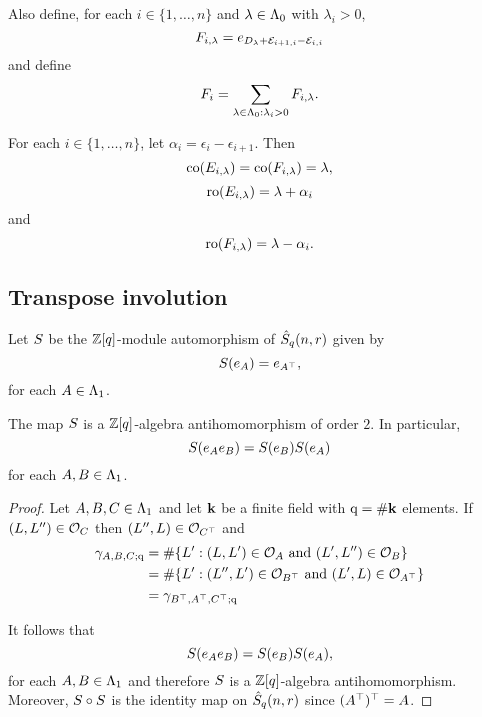 \documentclass[a4paper, 11pt]{report}
\begin{document}
Also define, for each $i\in\{1,\ldots,n\}$ and $\lambda\in\Lambda_0{}$ with $\lambda_i>0$,
\begin{equation*}
F_{i,\lambda} = e_{D_{\lambda} + \mathcal{E}_{i+1,i} - \mathcal{E}_{i,i}}
\end{equation*}
and define
\begin{equation*}
F_i = \sum_{\lambda\in\Lambda_0{}:\lambda_i>0} F_{i,\lambda}.
\end{equation*}

For each $i\in\{1,\ldots,n\}$, let $\alpha_i=\epsilon_i-\epsilon_{i+1}$. Then
\begin{equation*}
\operatorname{co}(E_{i,\lambda}) = \operatorname{co}(F_{i,\lambda})=\lambda,
\end{equation*}
\begin{equation*}
\operatorname{ro}(E_{i,\lambda}) = \lambda +\alpha_i
\end{equation*}
and
\begin{equation*}
\operatorname{ro}(F_{i,\lambda}) = \lambda - \alpha_i.
\end{equation*}

\subsection{Transpose involution}

Let $S{}$ be the $\mathbb{Z}[q]$-module automorphism of $\hat{S}_q(n,r)$ given by
\begin{equation*}
S{(e_A)} = e_{A^\top},
\end{equation*}
for each $A\in\Lambda_1{}$.

\begin{lemma}\label{lemma:transpose-involution}
The map $S{}$ is a $\mathbb{Z}[q]$-algebra antihomomorphism of order $2$. In particular,
\begin{equation*}
S{(e_A e_B)} = S{(e_B)}S{(e_A)}
\end{equation*}
for each $A,B\in\Lambda_1{}$.
\end{lemma}

\begin{proof}
Let $A,B,C\in\Lambda_1{}$ and let $\mathbf{k}$ be a finite field with $\mathrm{q}=\#\mathbf{k}$ elements. If $(L,L'')\in\mathcal{O}_{C}$ then $(L'',L)\in\mathcal{O}_{C^\top}$ and
\begin{align*}
\gamma_{A,B,C;\mathrm{q}}
&= \#\{L': (L,L')\in\mathcal{O}_{A}\text{ and } (L',L'')\in\mathcal{O}_{B}\}\\
&= \#\{L': (L'',L')\in\mathcal{O}_{B^\top}\text{ and } (L',L)\in\mathcal{O}_{A^\top}\}\\
&= \gamma_{B^\top,A^\top, C^\top;\mathrm{q}}
\end{align*}

It follows that
\begin{equation*}
S{(e_A e_B)} = S{(e_B)} S{(e_A)},
\end{equation*}
for each $A,B\in\Lambda_1{}$ and therefore $S{}$ is a $\mathbb{Z}[q]$-algebra antihomomorphism. Moreover, $S{}\circ S{}$ is the identity map on $\hat{S}_q(n,r)$ since $(A^\top)^\top = A$.
\end{proof}
\end{document}
